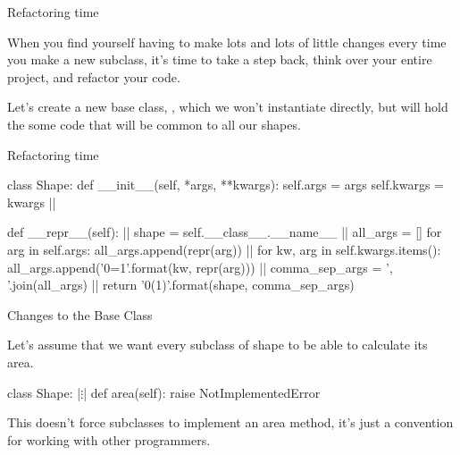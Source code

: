 \documentclass[aspectratio=169] {beamer}
\begin{document}
\begin{frame}[fragile]{Refactoring time}
  
  When you find yourself having to make lots and lots of little changes
  every time you make a new subclass, it's time to take a step back,
  think over your entire project, and refactor your code.
  
  \bigskip
  
  Let's create a new base class, , which we won't instantiate directly,
  but will hold the some code that will be common to all our shapes.
  
\end{frame}



\begin{frame}[fragile]{Refactoring time}

\small
\begin{pythoncode}
  class Shape:
      def __init__(self, *args, **kwargs): 
          self.args = args
          self.kwargs = kwargs |\pause|

      def __repr__(self): |\pause|
          shape = self.__class__.__name__ |\pause|
          all_args = []
          for arg in self.args:
              all_args.append(repr(arg))  |\pause|
          for kw, arg in self.kwargs.items():
              all_args.append('{0}={1}'.format(kw, repr(arg)))  |\pause|
          comma_sep_args = ', '.join(all_args) |\pause|
          return '{0}({1})'.format(shape, comma_sep_args)
\end{pythoncode}


\end{frame}


\begin{frame}[fragile]{Changes to the Base Class}

  Let's assume that we want every subclass of shape to be able to calculate its area.

  \pause

  \begin{pythoncode}
    class Shape:
            |$\vdots$|
        def area(self):
            raise NotImplementedError
        
  \end{pythoncode}
  
  \medskip \pause
  
  This doesn't force subclasses to implement an area method, 
  it's just a convention for working with other programmers.
  
  


\end{frame}
\end{document}
